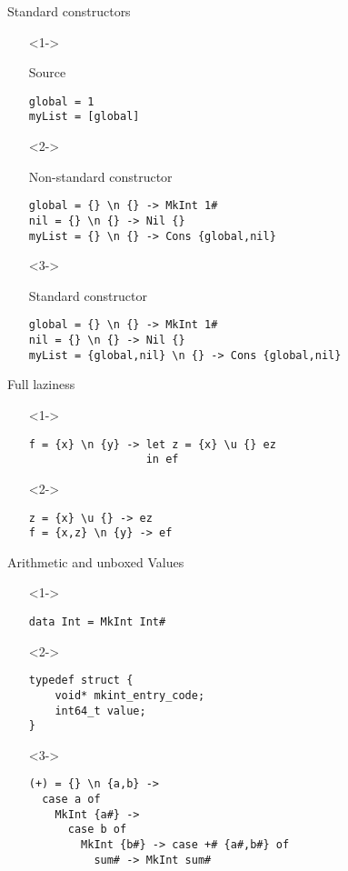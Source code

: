 \documentclass{beamer}
\begin{document}
\begin{frame}[fragile]{Standard constructors}
  \begin{itemize}
  \item[]<1-> \begin{block}{Source}
      \begin{verbatim}
global = 1
myList = [global]
      \end{verbatim}
    \end{block}
  \item[]<2-> \begin{block}{Non-standard constructor}
      \begin{verbatim}
global = {} \n {} -> MkInt 1#
nil = {} \n {} -> Nil {}
myList = {} \n {} -> Cons {global,nil}
      \end{verbatim}
    \end{block}
  \item[]<3-> \begin{block}{Standard constructor}
      \begin{verbatim}
global = {} \n {} -> MkInt 1#
nil = {} \n {} -> Nil {}
myList = {global,nil} \n {} -> Cons {global,nil}
      \end{verbatim}
    \end{block}
  \end{itemize}
\end{frame}

\begin{frame}[fragile]{Full laziness}
  \begin{itemize}
  \item[]<1-> \begin{verbatim}
f = {x} \n {y} -> let z = {x} \u {} ez
                  in ef
    \end{verbatim}
  \item[]<2-> \begin{verbatim}
z = {x} \u {} -> ez
f = {x,z} \n {y} -> ef
    \end{verbatim}
  \end{itemize}
\end{frame}

\begin{frame}[fragile]{Arithmetic and unboxed Values}
  \begin{itemize}
  \item[]<1-> \begin{verbatim}
data Int = MkInt Int#
    \end{verbatim}
  \item[]<2-> \begin{verbatim}
typedef struct {
    void* mkint_entry_code;
    int64_t value;
}
      \end{verbatim}
    \item[]<3-> \begin{verbatim}
(+) = {} \n {a,b} ->
  case a of
    MkInt {a#} ->
      case b of
        MkInt {b#} -> case +# {a#,b#} of
          sum# -> MkInt sum#
    \end{verbatim}
  \end{itemize}
\end{frame}
\end{document}
